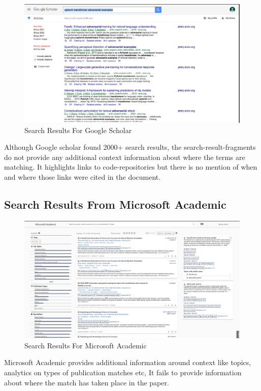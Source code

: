 \begin{figure}[h]
    \centering
    \includegraphics[width=\maxwidth{\textwidth}]{src/images/google-scholar-example.png}
    \caption{Search Results For Google Scholar}
    \label{figure\arabic{figurecounter}}
\end{figure}
Although Google scholar found 2000+ search results, the search-result-fragments do not provide any additional context information about where the terms are matching. 
It highlights links to code-repositories but there is no mention of when and where those links were cited in the document. 

\pagebreak
\subsection{Search Results From Microsoft Academic}
\label{sr-m}
\begin{figure}[h]
    \centering
    \includegraphics[width=\maxwidth{\textwidth}]{src/images/academic-example.png}
    \caption{Search Results For Microsoft Academic}
    \label{figure\arabic{figurecounter}}
\end{figure}
Microsoft Academic provides additional information around context like topics, analytics on types of publication matches etc,
It fails to provide information about where the match has taken place in the paper.

